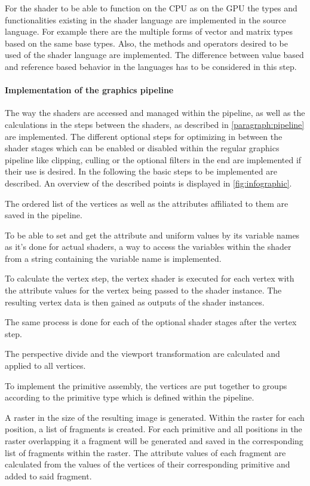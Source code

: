 For the shader to be able to function on the CPU as on the GPU the types and functionalities existing in the shader language are implemented in the source language. For example there are the multiple forms of vector and matrix types based on the same base types. Also, the methods and operators desired to be used of the shader language are implemented. The difference between value based and reference based behavior in the languages has to be considered in this step.

\paragraph{Implementation of the graphics pipeline}

The way the shaders are accessed and managed within the pipeline, as well as the calculations in the steps between the shaders, as described in \autoref{paragraph:pipeline} are implemented. The different optional steps for optimizing in between the shader stages which can be enabled or disabled within the regular graphics pipeline like clipping, culling or the optional filters in the end are implemented if their use is desired. In the following the basic steps to be implemented are described. An overview of the described points is displayed in \autoref{fig:infographic}.

The ordered list of the vertices as well as the attributes affiliated to them are saved in the pipeline.

To be able to set and get the attribute and uniform values by its variable names as it's done for actual shaders, a way to access the variables within the shader from a string containing the variable name is implemented.

To calculate the vertex step, the vertex shader is executed for each vertex with the attribute values for the vertex being passed to the shader instance. The resulting vertex data is then gained as outputs of the shader instances.

The same process is done for each of the optional shader stages after the vertex step.

The perspective divide and the viewport transformation are calculated and applied to all vertices.

To implement the primitive assembly, the vertices are put together to groups according to the primitive type which is defined within the pipeline.

A raster in the size of the resulting image is generated. Within the raster for each position, a list of fragments is created. For each primitive and all positions in the raster overlapping it a fragment will be generated and saved in the corresponding list of fragments within the raster. The attribute values of each fragment are calculated from the values of the vertices of their corresponding primitive and added to said fragment.

